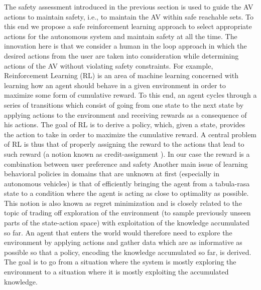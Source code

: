 The safety assessment introduced in the previous section is used to guide the AV actions to maintain safety, i.e., to maintain the AV within safe reachable sets. To this end we propose a safe reinforcement learning approach to select appropriate actions for the autonomous system and maintain safety at all the time. The innovation here is that we consider a human in the loop approach in which the desired actions from the user are taken into consideration while determining actions of the AV without violating safety constraints.  For example, 
Reinforcement Learning (RL) is an area of machine learning concerned with learning how an agent should behave in a given environment in order to maximize some form of cumulative reward. To this end, an agent cycles through a series of transitions which consist of going from one state to the next state by applying actions to the environment and receiving rewards as a consequence of his actions. The goal of RL is to derive a policy, which, given a state, provides the action to take in order to maximize the cumulative reward.
A central problem of RL is thus that of properly assigning the reward to the actions that lead to such reward (a notion known as credit-assignment \cite{kaelbling1996reinforcement, sutton1998reinforcement}). In our case the reward is a combination between user preference and safety 
Another main issue of learning behavioral policies in domains that are unknown at first (especially in autonomous vehicles) is that of efficiently bringing the agent from a tabula-rasa state to a condition where the agent is acting as close to optimality as possible. This notion is also known as regret minimization \cite{kaelbling1996reinforcement, sutton1998reinforcement} and is closely related to the topic of trading off exploration of the environment (to sample previously unseen parts of the state-action space) with exploitation of the knowledge accumulated so far. 
An agent that enters the world would therefore need to explore the environment by applying actions and gather data which are as informative as possible so that a policy, encoding the knowledge accumulated so far, is derived. The goal is to go from a situation where the system is mostly exploring the environment to a situation where it is mostly exploiting the accumulated knowledge. 
